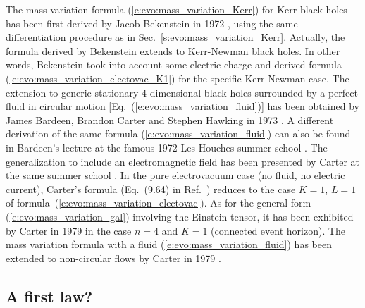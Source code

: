 \begin{hist}
The mass-variation formula (\ref{e:evo:mass_variation_Kerr}) for Kerr black holes
has been first
derived by Jacob Bekenstein
in 1972 \cite{Beken73a,Beken73b}, using the same differentiation procedure as in
Sec.~\ref{s:evo:mass_variation_Kerr}. Actually, the formula derived by Bekenstein
extends to Kerr-Newman black holes.
In other words, Bekenstein took into account some electric charge and derived
formula (\ref{e:evo:mass_variation_electovac_K1})
for the specific Kerr-Newman case.
The extension to generic stationary 4-dimensional black holes
surrounded by a perfect fluid in circular motion [Eq.~(\ref{e:evo:mass_variation_fluid})]
has been obtained by James Bardeen, Brandon Carter
and Stephen Hawking in 1973 \cite{BardeCH73}.
A different derivation of the same formula (\ref{e:evo:mass_variation_fluid})
can also be found in Bardeen's lecture at the famous 1972 Les Houches summer school
\cite{Barde73b}.
The generalization to include an electromagnetic field has been presented by Carter
at the same summer school \cite{Carte73b}. In the pure electrovacuum case
(no fluid, no electric current), Carter's formula (Eq.~(9.64) in Ref.~\cite{Carte73b})
reduces to the case $K=1$, $L=1$ of formula~(\ref{e:evo:mass_variation_electovac}).
As for the general form (\ref{e:evo:mass_variation_gal}) involving the Einstein tensor, it has been exhibited by Carter in 1979 \cite{Carte79c} in the case $n=4$ and $K=1$
(connected event horizon).
The mass variation formula with a fluid (\ref{e:evo:mass_variation_fluid}) has been extended to non-circular flows by Carter in 1979 \cite{Carte79b}.
\end{hist}


\subsection{A first law?}
\label{s:evo:a_first_law_question}

